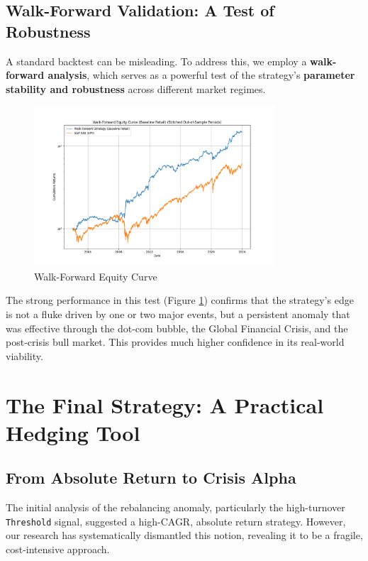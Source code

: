 \documentclass{article}
\begin{document}
\subsection{Walk-Forward Validation: A Test of Robustness}
A standard backtest can be misleading. To address this, we employ a \textbf{walk-forward analysis}, which serves as a powerful test of the strategy's \textbf{parameter stability and robustness} across different market regimes.

\begin{figure}[htbp]
\centering
\includegraphics[width=0.8\textwidth]{plots/plot_walk_forward.png}
\caption{Walk-Forward Equity Curve}
\label{fig:walk_forward}
\end{figure}

The strong performance in this test (Figure \ref{fig:walk_forward}) confirms that the strategy's edge is not a fluke driven by one or two major events, but a persistent anomaly that was effective through the dot-com bubble, the Global Financial Crisis, and the post-crisis bull market. This provides much higher confidence in its real-world viability.

\section{The Final Strategy: A Practical Hedging Tool}

\subsection{From Absolute Return to Crisis Alpha}
The initial analysis of the rebalancing anomaly, particularly the high-turnover \texttt{Threshold} signal, suggested a high-CAGR, absolute return strategy. However, our research has systematically dismantled this notion, revealing it to be a fragile, cost-intensive approach.
\end{document}
